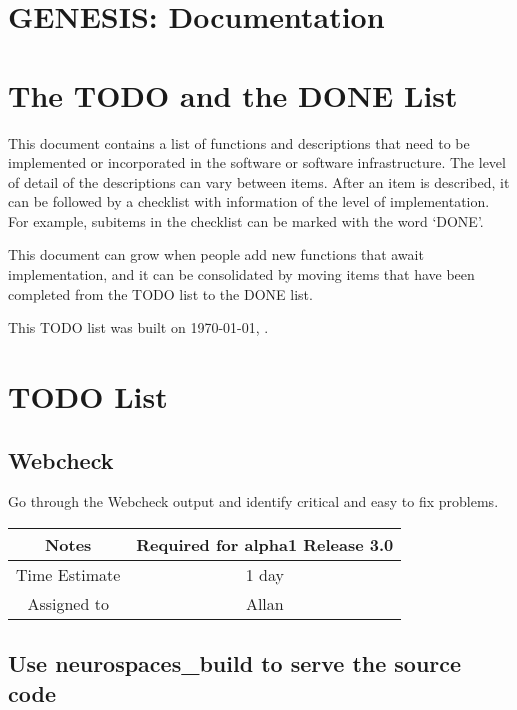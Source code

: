 \documentclass[12pt]{article}
\begin{document}
\section*{GENESIS: Documentation}

\section{The TODO and the DONE List}

This document contains a list of functions and descriptions that need
to be implemented or incorporated in the software or software
infrastructure.  The level of detail of the descriptions can vary
between items.  After an item is described, it can be followed by a
checklist with information of the level of implementation.  For
example, subitems in the checklist can be marked with the word `DONE'.

This document can grow when people add new functions that await
implementation, and it can be consolidated by moving items that have
been completed from the TODO list to the DONE list.

This TODO list was built on \today, \thistime.


\section{TODO List}

\subsection{Webcheck}

Go through the Webcheck output and identify critical and easy to fix
problems.

{
  \vspace{5mm}
  \centering
  \begin{tabular}{|c|c|}
    \hline
    Notes
    & Required for alpha1 Release 3.0 \\
    \hline
    Time Estimate
    & 1 day \\
    \hline
    Assigned to
    & Allan \\
    \hline
  \end{tabular}
}


\subsection{Use neurospaces\_build to serve the source code}
\end{document}
